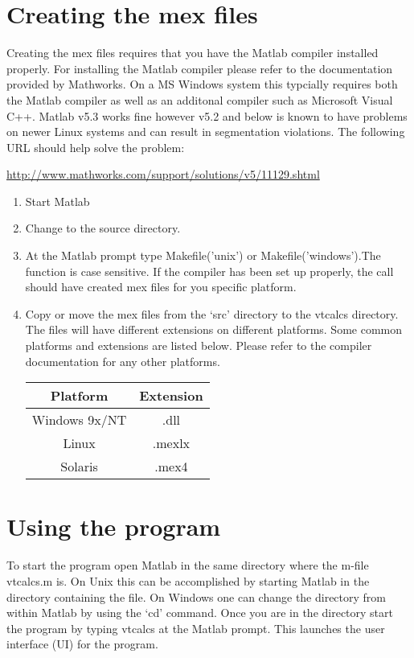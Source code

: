 \section{Creating the mex files}
Creating the mex files requires that you have the Matlab compiler
installed properly. For installing the Matlab compiler please refer to
the documentation provided by Mathworks. On a MS Windows system this
typcially requires both the Matlab compiler as well as an additonal
compiler such as Microsoft Visual C++. Matlab v5.3 works fine however
v5.2 and below is known to have problems on newer Linux systems and
can result in segmentation violations. The following URL should help
solve the problem:
\begin{center}
\href{http://www.mathworks.com/support/solutions/v5/11129.shtml}
{http://www.mathworks.com/support/solutions/v5/11129.shtml}
\end{center}

\begin{enumerate}
\item Start Matlab
\item Change to the source directory.
\item At the Matlab prompt type Makefile('unix') or
Makefile('windows').The function is case sensitive. If the
compiler has been set up properly, the call should have created
mex files for you specific platform.
\item Copy or move the mex files from the `src' directory to the vtcalcs
directory. The files will have different extensions on different
platforms. Some common platforms and extensions are listed below.
Please refer to the compiler documentation for any other
platforms.\\
\begin{center}
\begin{tabular}{|c|c|}
\hline
   Platform    & Extension \\
\hline
 Windows 9x/NT &   .dll    \\
\hline
     Linux     &  .mexlx   \\
\hline
  Solaris  &   .mex4   \\
\hline
\end{tabular}
\end{center}
\end{enumerate}

\section{Using the program}
To start the program open Matlab in the same directory where the
m-file vtcalcs.m is. On Unix this can be accomplished by starting
Matlab in the directory containing the file. On Windows one can
change the directory from within Matlab by using the `cd' command.
Once you are in the directory start the program by typing vtcalcs
at the Matlab prompt. This launches the user interface (UI) for
the program.

